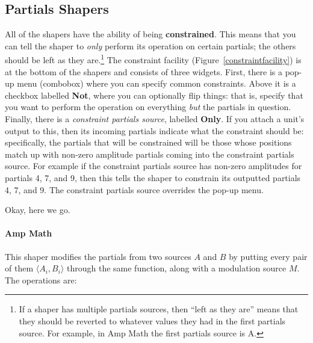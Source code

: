 \documentclass{article}
\begin{document}
\subsection{Partials Shapers}
\label{unitshapers}


All of the shapers have the ability of being {\bf constrained}.  This means that you can tell the shaper to {\it only} perform its operation on certain partials; the others should be left as they are.\footnote{If a shaper has multiple partials sources, then ``left as they are'' means that they should be reverted to whatever values they had in the first partials source.  For example, in Amp Math the first partials source is A.}  The constraint facility (Figure~\ref{constraintfacility}) is at the bottom of the shapers and consists of three widgets.  First, there is a pop-up menu (combobox) where you can specify common constraints.  Above it is a checkbox labelled {\bf Not}, where you can optionally flip things: that is, specify that you want to perform the operation on everything {\it but} the partials in question.  Finally, there is a {\it constraint partials source}, labelled {\bf Only}. If you attach a unit's output to this, then its incoming partials indicate what the constraint should be: specifically, the partials that will be constrained will be those whose positions match up with non-zero amplitude partials coming into the constraint partials source. For example if the constraint partials source has non-zero amplitudes for partials 4, 7, and 9, then this tells the shaper to constrain its outputted partials 4, 7, and 9.  The constraint partials source overrides the pop-up menu.

Okay, here we go.



\paragraph{Amp Math}  This shaper modifies the partials from two sources \(A\) and \(B\) by putting every pair of them \(\langle A_i, B_i\rangle\) through the same function, along with a modulation source \(M\).  The operations are:
\end{document}
